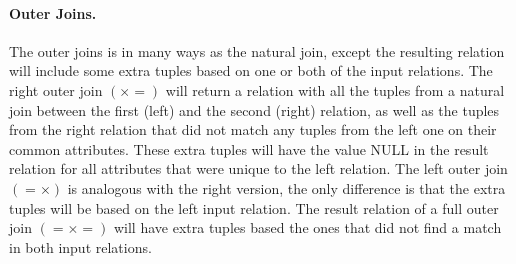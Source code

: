 \paragraph{Outer Joins.}
\label{sect:theory:relAlg:outerJoin}
The outer joins is in many ways as the natural join, except the resulting relation will include some extra
tuples based on one or both of the input relations. The right outer join $(\times=)$ will return a relation with
all the tuples from a natural join between the first (left) and the second (right) relation, as well as the tuples
from the right relation that did not match any tuples from the left one on their common attributes. These extra
tuples will have the value NULL in the result relation for all attributes that were unique to the left relation.
The left outer join $(=\times)$ is analogous with the right version, the only difference is that the extra tuples
will be based on the left input relation. The result relation of a full outer join $(=\times=)$ will have extra
tuples based the ones that did not find a match in both input relations.
